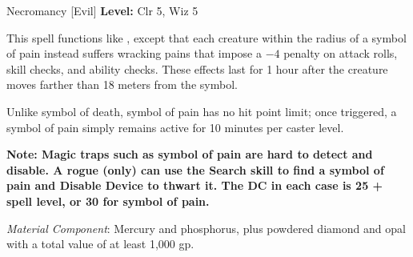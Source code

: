 {Necromancy [Evil]}
{
	\textbf{Level:}
	Clr 5, Wiz 5\\
}
{
	This spell functions like , except that each creature within the radius of a symbol of pain instead suffers wracking pains that impose a $-4$ penalty on attack rolls, skill checks, and ability checks. These effects last for 1 hour after the creature moves farther than 18 meters from the symbol.

	Unlike symbol of death, symbol of pain has no hit point limit; once triggered, a symbol of pain simply remains active for 10 minutes per caster level.

	\textbf{Note: Magic traps such as symbol of pain are hard to detect and disable. A rogue (only) can use the Search skill to find a symbol of pain and Disable Device to thwart it. The DC in each case is 25 + spell level, or 30 for symbol of pain.}

	\textit{Material Component}:
	Mercury and phosphorus, plus powdered diamond and opal with a total value of at least 1,000 gp.

}
